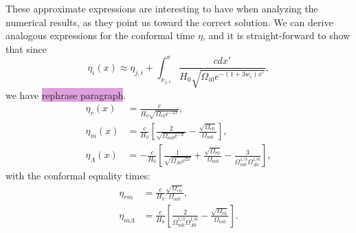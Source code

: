 \documentclass{aa}
\begin{document}
These approximate expressions are interesting to have when analyzing the numerical results, as they point us toward the correct solution. We can derive analogous expressions for the conformal time $\eta$, and it is straight-forward to show that since
\begin{equation}
  \eta_i(x) \approx \eta_{j,i} + \int_{x_{j,i}}^{x}\frac{cdx'}{H_0\sqrt{\Omega_{i0}e^{-(1+3w_i)x'}}},
\end{equation}
we have \colorbox{Plum}{rephrase paragraph}.
\begin{align}
  \eta_r(x) &= \frac{c}{H_0\sqrt{\Omega_{r0}e^{-2x}}},
  \\
  \eta_m(x) &= \frac{c}{H_0}\left[\frac{2}{\sqrt{\Omega_{m0}e^{-x}}} - \frac{\sqrt{\Omega_{r0}}}{\Omega_{m0}} \right],
  \\
  \eta_\Lambda(x) &= -\frac{c}{H_0}\left[\frac{1}{\sqrt{\Omega_{\Lambda0}e^{2x}}} +\frac{\sqrt{\Omega_{r0}}}{\Omega_{m0}} - \frac{3}{\Omega_{m0}^{1/3}\Omega_{\Lambda0}^{1/6}} \right],
\end{align}
with the conformal equality times:
\begin{align}
  \eta_{rm} &= \frac{c}{H_0}\frac{\sqrt{\Omega_{r0}}}{\Omega_{m0}},
  \\
  \eta_{m\Lambda} &= \frac{c}{H_0}\left[\frac{2}{\Omega_{m0}^{1/3}\Omega_{\Lambda0}^{1/6}} - \frac{\sqrt{\Omega_{r0}}}{\Omega_{m0}}\right].
\end{align}
\end{document}
